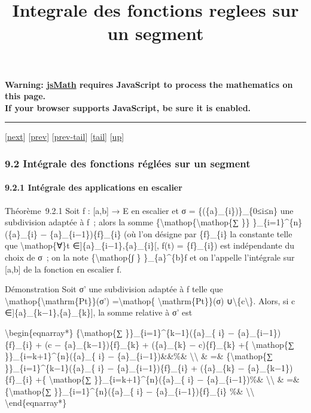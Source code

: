 \documentclass[]{article}
\title{Integrale des fonctions reglees sur un segment}
\author{}
\date{}
\begin{document}
\maketitle

\textbf{Warning: \href{http://www.math.union.edu/locate/jsMath}{jsMath}
requires JavaScript to process the mathematics on this page.\\ If your
browser supports JavaScript, be sure it is enabled.}

\begin{center}\rule{3in}{0.4pt}\end{center}

{[}\href{coursse52.html}{next}{]} {[}\href{coursse50.html}{prev}{]}
{[}\href{coursse50.html\#tailcoursse50.html}{prev-tail}{]}
{[}\hyperref[tailcoursse51.html]{tail}{]}
{[}\href{coursch10.html\#coursse51.html}{up}{]}

\subsubsection{9.2 Intégrale des fonctions réglées sur un segment}

\paragraph{9.2.1 Intégrale des applications en escalier}

Théorème~9.2.1 Soit f : {[}a,b{]} → E en escalier et σ =
\{(\{a\}\_\{i\})\}\_\{0≤i≤n\} une subdivision adaptée à f~; alors la
somme \{\textbackslash{}mathop\{\textbackslash{}mathop\{∑ \}\}
\}\_\{i=1\}\^{}\{n\}(\{a\}\_\{i\} − \{a\}\_\{i−1\})\{f\}\_\{i\} (où l'on
désigne par \{f\}\_\{i\} la constante telle que
\textbackslash{}mathop\{∀\}t ∈{]}\{a\}\_\{i−1\},\{a\}\_\{i\}{[}, f(t) =
\{f\}\_\{i\}) est indépendante du choix de σ~; on la note
\{\textbackslash{}mathop\{∫ \} \}\_\{a\}\^{}\{b\}f et on l'appelle
l'intégrale sur {[}a,b{]} de la fonction en escalier f.

Démonstration Soit σ' une subdivision adaptée à f telle que
\textbackslash{}mathop\{\textbackslash{}mathrm\{Pt\}\}(σ')
=\textbackslash{}mathop\{ \textbackslash{}mathrm\{Pt\}\}(σ)
∪\textbackslash{}\{c\textbackslash{}\}. Alors, si c
∈{]}\{a\}\_\{k−1\},\{a\}\_\{k\}{]}, la somme relative à σ' est

\textbackslash{}begin\{eqnarray*\} \{\textbackslash{}mathop\{∑
\}\}\_\{i=1\}\^{}\{k−1\}(\{a\}\_\{ i\} − \{a\}\_\{i−1\})\{f\}\_\{i\} +
(c − \{a\}\_\{k−1\})\{f\}\_\{k\} + (\{a\}\_\{k\} − c)\{f\}\_\{k\} +\{
\textbackslash{}mathop\{∑ \}\}\_\{i=k+1\}\^{}\{n\}(\{a\}\_\{ i\} −
\{a\}\_\{i−1\})\&\&\%\& \textbackslash{}\textbackslash{} \& =\&
\{\textbackslash{}mathop\{∑ \}\}\_\{i=1\}\^{}\{k−1\}(\{a\}\_\{ i\} −
\{a\}\_\{i−1\})\{f\}\_\{i\} + (\{a\}\_\{k\} −
\{a\}\_\{k−1\})\{f\}\_\{i\} +\{ \textbackslash{}mathop\{∑
\}\}\_\{i=k+1\}\^{}\{n\}(\{a\}\_\{ i\} − \{a\}\_\{i−1\})\%\&
\textbackslash{}\textbackslash{} \& =\& \{\textbackslash{}mathop\{∑
\}\}\_\{i=1\}\^{}\{n\}(\{a\}\_\{ i\} − \{a\}\_\{i−1\})\{f\}\_\{i\} \%\&
\textbackslash{}\textbackslash{} \textbackslash{}end\{eqnarray*\}
\end{document}
